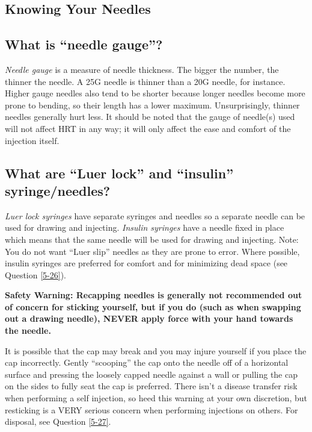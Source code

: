 \documentclass{article}
\begin{document}
\subsection*{Knowing Your Needles}

\subsection{What is “needle gauge”?}

\textit{Needle gauge} is a measure of needle thickness. The bigger the number, the thinner the needle. A 25G needle is thinner than a 20G needle, for instance. Higher gauge needles also tend to be shorter because longer needles become more prone to bending, so their length has a lower maximum. Unsurprisingly, thinner needles generally hurt less. It should be noted that the gauge of needle(s) used will not affect HRT in any way; it will only affect the ease and comfort of the injection itself.

\subsection{What are “Luer lock” and “insulin” syringe/needles?}\label{5-13}

\textit{Luer lock syringes} have separate syringes and needles so a separate needle can be used for drawing and injecting. \textit{Insulin syringes} have a needle fixed in place which means that the same needle will be used for drawing and injecting. Note: You do not want “Luer slip” needles as they are prone to error. Where possible, insulin syringes are preferred for comfort and for minimizing dead space (see Question \ref{5-26}).

\textbf{Safety Warning: Recapping needles is generally not recommended out of concern for sticking yourself, but if you do (such as when swapping out a drawing needle), NEVER apply force with your hand towards the needle.}

It is possible that the cap may break and you may injure yourself if you place the cap incorrectly. Gently “scooping” the cap onto the needle off of a horizontal surface and pressing the loosely capped needle against a wall or pulling the cap on the sides to fully seat the cap is preferred. There isn't a disease transfer risk when performing a self injection, so heed this warning at your own discretion, but resticking is a VERY serious concern when performing injections on others. For disposal, see Question \ref{5-27}.
\end{document}
